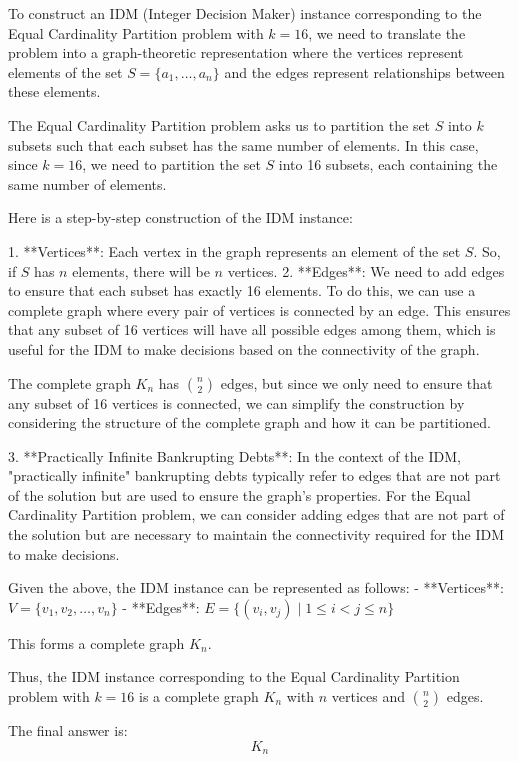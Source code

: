 To construct an IDM (Integer Decision Maker) instance corresponding to the Equal Cardinality Partition problem with \( k = 16 \), we need to translate the problem into a graph-theoretic representation where the vertices represent elements of the set \( S = \{a_1, \ldots, a_n\} \) and the edges represent relationships between these elements.

The Equal Cardinality Partition problem asks us to partition the set \( S \) into \( k \) subsets such that each subset has the same number of elements. In this case, since \( k = 16 \), we need to partition the set \( S \) into 16 subsets, each containing the same number of elements.

Here is a step-by-step construction of the IDM instance:

1. **Vertices**: Each vertex in the graph represents an element of the set \( S \). So, if \( S \) has \( n \) elements, there will be \( n \) vertices.
2. **Edges**: We need to add edges to ensure that each subset has exactly 16 elements. To do this, we can use a complete graph where every pair of vertices is connected by an edge. This ensures that any subset of 16 vertices will have all possible edges among them, which is useful for the IDM to make decisions based on the connectivity of the graph.

The complete graph \( K_n \) has \( \binom{n}{2} \) edges, but since we only need to ensure that any subset of 16 vertices is connected, we can simplify the construction by considering the structure of the complete graph and how it can be partitioned.

3. **Practically Infinite Bankrupting Debts**: In the context of the IDM, "practically infinite" bankrupting debts typically refer to edges that are not part of the solution but are used to ensure the graph's properties. For the Equal Cardinality Partition problem, we can consider adding edges that are not part of the solution but are necessary to maintain the connectivity required for the IDM to make decisions.

Given the above, the IDM instance can be represented as follows:
- **Vertices**: \( V = \{v_1, v_2, \ldots, v_n\} \)
- **Edges**: \( E = \{(v_i, v_j) \mid 1 \leq i < j \leq n\} \)

This forms a complete graph \( K_n \).

Thus, the IDM instance corresponding to the Equal Cardinality Partition problem with \( k = 16 \) is a complete graph \( K_n \) with \( n \) vertices and \( \binom{n}{2} \) edges.

The final answer is:
\[
\boxed{K_n}
\]